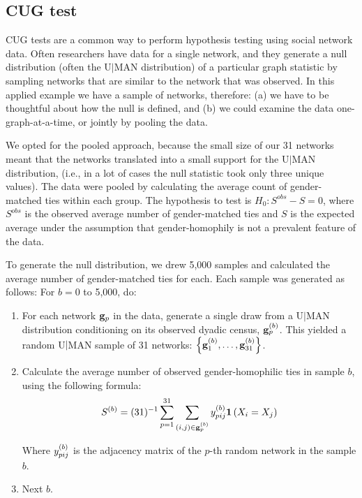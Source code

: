 \documentclass[]{article}
\begin{document}
\subsection{CUG test}

CUG tests are a common way to perform hypothesis testing using social network data. Often researchers have data for a single network, and they generate a null distribution (often the U$|$MAN distribution) of a particular graph statistic by sampling networks that are similar to the network that was observed. In this applied example we have a sample of networks, therefore: (a) we have to be thoughtful about how the null is defined, and (b) we could examine the data one-graph-at-a-time, or jointly by pooling the data.

We opted for the pooled approach, because the small size of our 31 networks meant that the networks translated into a small support for the U$|$MAN distribution, (i.e., in a lot of cases the null statistic took only three unique values). The data were pooled by calculating the average count of gender-matched ties within each group. The hypothesis to test is $H_0: S^{obs} - S = 0$, where $S^{obs}$ is the observed average number of gender-matched ties and $S$ is the expected average under the assumption that gender-homophily is not a prevalent feature of the data. 

To generate the null distribution, we drew 5,000 samples and calculated the average number of gender-matched ties for each. Each sample was generated as follows: For $b = 0$ to 5,000, do:

\begin{enumerate}
    \item For each network $\mathbf{g}_p$ in the data, generate a single draw from a U$|$MAN distribution conditioning on its observed dyadic census, $\mathbf{g}_p^{(b)}$. This yielded a random U$|$MAN sample of 31 networks: $\left\{\mathbf{g}_1^{(b)}, \dots, \mathbf{g}_{31}^{(b)}\right\}$.
    \item Calculate the average number of observed gender-homophilic ties in sample $b$, using the following formula:
    \begin{equation*}
        S^{(b)} = (31)^{-1}\sum_{p=1}^{31}\sum_{(i, j) \in \mathbf{g}_p^{(b)}}y_{pij}^{(b)}{\boldsymbol{1}\left( X_{i} = X_{j} \right)}
    \end{equation*}
    
    Where $y_{pij}^{(b)}$ is the adjacency matrix of the $p$-th random network in the sample $b$.
    \item Next $b$.
\end{enumerate}
\end{document}
